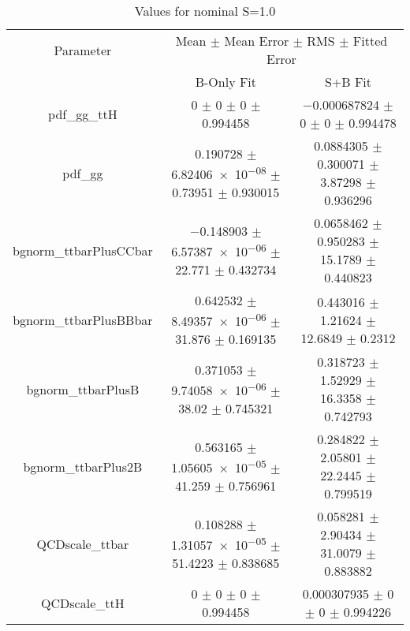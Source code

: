 \begin{table}
\centering
\caption{Values for nominal S=1.0}
\begin{tabular}{ccc}
\toprule
Parameter & \multicolumn{2}{c}{Mean $\pm$ Mean Error $\pm$ RMS $\pm$ Fitted Error}\\
 & B-Only Fit & S+B Fit\\
\midrule
pdf\_gg\_ttH & \num{0} $\pm$ \num{0} $\pm$ \num{0} $\pm$ \num{0.994458} & \num{-0.000687824} $\pm$ \num{0} $\pm$ \num{0} $\pm$ \num{0.994478}\\
pdf\_gg & \num{0.190728} $\pm$ \num{6.82406e-08} $\pm$ \num{0.73951} $\pm$ \num{0.930015} & \num{0.0884305} $\pm$ \num{0.300071} $\pm$ \num{3.87298} $\pm$ \num{0.936296}\\
bgnorm\_ttbarPlusCCbar & \num{-0.148903} $\pm$ \num{6.57387e-06} $\pm$ \num{22.771} $\pm$ \num{0.432734} & \num{0.0658462} $\pm$ \num{0.950283} $\pm$ \num{15.1789} $\pm$ \num{0.440823}\\
bgnorm\_ttbarPlusBBbar & \num{0.642532} $\pm$ \num{8.49357e-06} $\pm$ \num{31.876} $\pm$ \num{0.169135} & \num{0.443016} $\pm$ \num{1.21624} $\pm$ \num{12.6849} $\pm$ \num{0.2312}\\
bgnorm\_ttbarPlusB & \num{0.371053} $\pm$ \num{9.74058e-06} $\pm$ \num{38.02} $\pm$ \num{0.745321} & \num{0.318723} $\pm$ \num{1.52929} $\pm$ \num{16.3358} $\pm$ \num{0.742793}\\
bgnorm\_ttbarPlus2B & \num{0.563165} $\pm$ \num{1.05605e-05} $\pm$ \num{41.259} $\pm$ \num{0.756961} & \num{0.284822} $\pm$ \num{2.05801} $\pm$ \num{22.2445} $\pm$ \num{0.799519}\\
QCDscale\_ttbar & \num{0.108288} $\pm$ \num{1.31057e-05} $\pm$ \num{51.4223} $\pm$ \num{0.838685} & \num{0.058281} $\pm$ \num{2.90434} $\pm$ \num{31.0079} $\pm$ \num{0.883882}\\
QCDscale\_ttH & \num{0} $\pm$ \num{0} $\pm$ \num{0} $\pm$ \num{0.994458} & \num{0.000307935} $\pm$ \num{0} $\pm$ \num{0} $\pm$ \num{0.994226}\\
\bottomrule
\end{tabular}
\end{table}